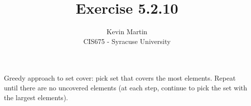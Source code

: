 \documentclass{article}
\author{Kevin Martin\\ CIS675 - Syracuse University}
\title{Exercise 5.2.10}
\begin{document}
\maketitle
Greedy approach to set cover: pick set that covers the most
elements. Repeat until there are no uncovered elements (at
each step, continue to pick the set with the largest elements).
\end{document}
